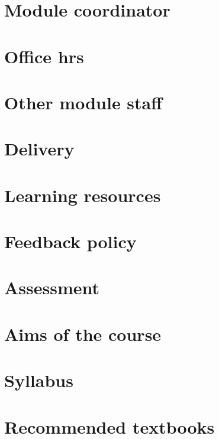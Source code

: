 \renewcommand{\prevpart}{0 }
\renewcommand{\thispart}{0 }
\renewcommand{\nextpart}{0 }

\renewcommand{\thispartname}{Information on \modulename}

\section{Module coordinator}


\section{Office hrs}


\section{Other module staff}


\section{Delivery}


\section{Learning resources}

\section{Feedback policy}


\section{Assessment}


\section{Aims of the course}


\section{Syllabus}


\section{Recommended textbooks}


